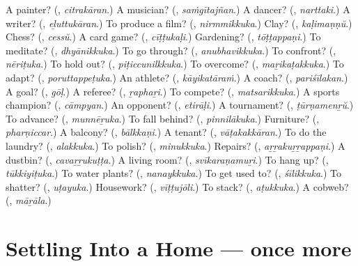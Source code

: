 \begin{tcolorbox}[breakable,colback=teal!4,colframe=teal!35!black,title={Before you move on}]
A painter? (\textbf{}, \emph{citrakāran}.) A musician? (\textbf{}, \emph{saṁgītajñan}.) A dancer? (\textbf{}, \emph{narttaki}.) A writer? (\textbf{}, \emph{eḻuttukāran}.) To produce a film? (\textbf{}, \emph{nirmmikkuka}.) Clay? (\textbf{}, \emph{kaḷimaṇṇŭ}.) Chess? (\textbf{}, \emph{cessŭ}.) A card game? (\textbf{}, \emph{cīṭṭukaḷi}.) Gardening? (\textbf{}, \emph{tōṭṭappaṇi}.) To meditate? (\textbf{}, \emph{dhyānikkuka}.) To go through? (\textbf{}, \emph{anubhavikkuka}.) To confront? (\textbf{}, \emph{nēriṭuka}.) To hold out? (\textbf{}, \emph{piṭiccunilkkuka}.) To overcome? (\textbf{}, \emph{maṟikaṭakkuka}.) To adapt? (\textbf{}, \emph{poruttappeṭuka}.) An athlete? (\textbf{}, \emph{kāyikatāraṁ}.) A coach? (\textbf{}, \emph{pariśīlakan}.) A goal? (\textbf{}, \emph{gōḷ}.) A referee? (\textbf{}, \emph{ṟaphaṟi}.) To compete? (\textbf{}, \emph{matsarikkuka}.) A sports champion? (\textbf{}, \emph{cāmpyan}.) An opponent? (\textbf{}, \emph{etirāḷi}.) A tournament? (\textbf{}, \emph{ṭūrṇamenṟŭ}.) To advance? (\textbf{}, \emph{munnēṟuka}.) To fall behind? (\textbf{}, \emph{pinnilākuka}.) Furniture? (\textbf{}, \emph{pharṇiccar}.) A balcony? (\textbf{}, \emph{bālkkaṇi}.) A tenant? (\textbf{}, \emph{vāṭakakkāran}.) To do the laundry? (\textbf{}, \emph{alakkuka}.) To polish? (\textbf{}, \emph{minukkuka}.) Repairs? (\textbf{}, \emph{aṟṟakuṟṟappaṇi}.) A dustbin? (\textbf{}, \emph{cavaṟṟukuṭṭa}.) A living room? (\textbf{}, \emph{svīkaraṇamuṟi}.) To hang up? (\textbf{}, \emph{tūkkiyiṭuka}.) To water plants? (\textbf{}, \emph{nanaykkuka}.) To get used to? (\textbf{}, \emph{śīlikkuka}.) To shatter? (\textbf{}, \emph{uṭayuka}.) Housework? (\textbf{}, \emph{vīṭṭujōli}.) To stack? (\textbf{}, \emph{aṭukkuka}.) A cobweb? (\textbf{}, \emph{māṟāla}.)
\end{tcolorbox}
\section[(dialogue)]{Settling Into a Home — once more}

